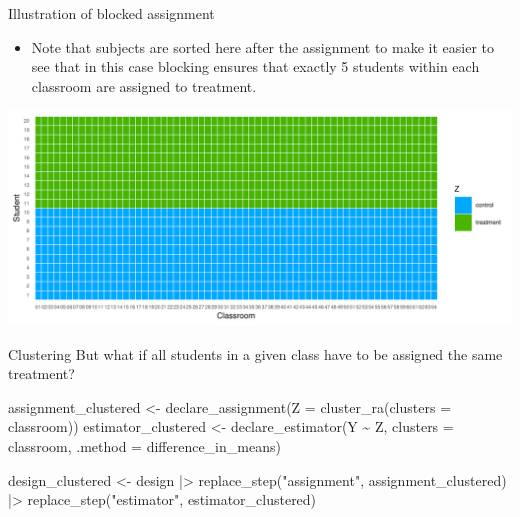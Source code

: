 \documentclass[
  11pt,
  ignorenonframetext,
]{beamer}
\newenvironment{Shaded}{\begin{snugshade}}{\end{snugshade}}
\newcommand{\AttributeTok}[1]{\textcolor[rgb]{0.40,0.45,0.13}{#1}}
\newcommand{\FunctionTok}[1]{\textcolor[rgb]{0.28,0.35,0.67}{#1}}
\newcommand{\NormalTok}[1]{\textcolor[rgb]{0.00,0.23,0.31}{#1}}
\newcommand{\OtherTok}[1]{\textcolor[rgb]{0.00,0.23,0.31}{#1}}
\newcommand{\SpecialCharTok}[1]{\textcolor[rgb]{0.37,0.37,0.37}{#1}}
\newcommand{\StringTok}[1]{\textcolor[rgb]{0.13,0.47,0.30}{#1}}
\providecommand{\tightlist}{%
  \setlength{\itemsep}{0pt}\setlength{\parskip}{0pt}}\usepackage{longtable,booktabs,array}
\begin{document}
\begin{frame}{Illustration of blocked assignment}
\protect\hypertarget{illustration-of-blocked-assignment}{}
\begin{itemize}
\tightlist
\item
  Note that subjects are sorted here after the assignment to make it
  easier to see that in this case blocking ensures that exactly 5
  students within each classroom are assigned to treatment.
\end{itemize}

\includegraphics{0_lectures_files/figure-beamer/unnamed-chunk-400-1.pdf}
\end{frame}

\begin{frame}[fragile]{Clustering}
\protect\hypertarget{clustering}{}
But what if all students in a given class have to be assigned the same
treatment?

\begin{Shaded}
\begin{Highlighting}[]
\NormalTok{assignment\_clustered }\OtherTok{\textless{}{-}} 
  \FunctionTok{declare\_assignment}\NormalTok{(}\AttributeTok{Z =} \FunctionTok{cluster\_ra}\NormalTok{(}\AttributeTok{clusters =}\NormalTok{ classroom))  }
\NormalTok{estimator\_clustered }\OtherTok{\textless{}{-}} 
  \FunctionTok{declare\_estimator}\NormalTok{(Y }\SpecialCharTok{\textasciitilde{}}\NormalTok{ Z, }\AttributeTok{clusters =}\NormalTok{ classroom, }
                    \AttributeTok{.method =}\NormalTok{ difference\_in\_means)  }


\NormalTok{design\_clustered }\OtherTok{\textless{}{-}} 
\NormalTok{  design }\SpecialCharTok{|\textgreater{}} 
  \FunctionTok{replace\_step}\NormalTok{(}\StringTok{"assignment"}\NormalTok{, assignment\_clustered) }\SpecialCharTok{|\textgreater{}} 
  \FunctionTok{replace\_step}\NormalTok{(}\StringTok{"estimator"}\NormalTok{, estimator\_clustered)}
\end{Highlighting}
\end{Shaded}
\end{frame}
\end{document}
